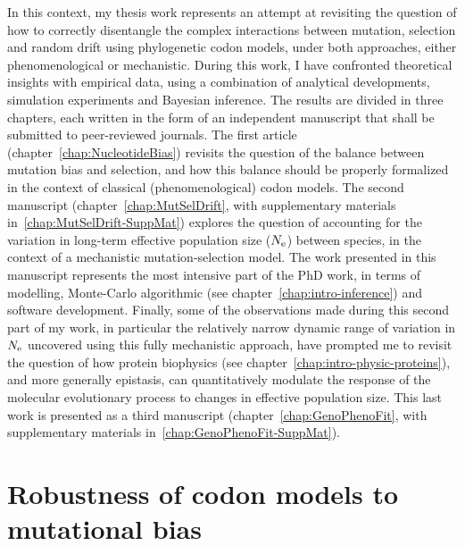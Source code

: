 In this context, my thesis work represents an attempt at revisiting the question of how to correctly disentangle the complex interactions between mutation, selection and random drift using phylogenetic codon models, under both approaches, either phenomenological or mechanistic.
During this work, I have confronted theoretical insights with empirical data, using a combination of analytical developments, simulation experiments and Bayesian inference.
The results are divided in three chapters, each written in the form of an independent manuscript that shall be submitted to peer-reviewed journals.
The first article (chapter~\ref{chap:NucleotideBias}) revisits the question of the balance between mutation bias and selection, and how this balance should be properly formalized in the context of classical (phenomenological) codon models.
The second manuscript (chapter~\ref{chap:MutSelDrift}, with supplementary materials in~\ref{chap:MutSelDrift-SuppMat}) explores the question of accounting for the variation in long-term effective population size ($N_{\textrm{e}}$) between species, in the context of a mechanistic mutation-selection model.
The work presented in this manuscript represents the most intensive part of the PhD work, in terms of modelling, Monte-Carlo algorithmic (see chapter~\ref{chap:intro-inference}) and software development.
Finally, some of the observations made during this second part of my work, in particular the relatively narrow dynamic range of variation in $N_{\textrm{e}}$ uncovered using this fully mechanistic approach, have prompted me to revisit the question of how protein biophysics (see chapter~\ref{chap:intro-physic-proteins}), and more generally epistasis, can quantitatively modulate the response of the molecular evolutionary process to changes in effective population size.
This last work is presented as a third manuscript (chapter~\ref{chap:GenoPhenoFit}, with supplementary materials in~\ref{chap:GenoPhenoFit-SuppMat}).

\section{Robustness of codon models to mutational bias}
\label{sec-goals:NucleotideBias}

